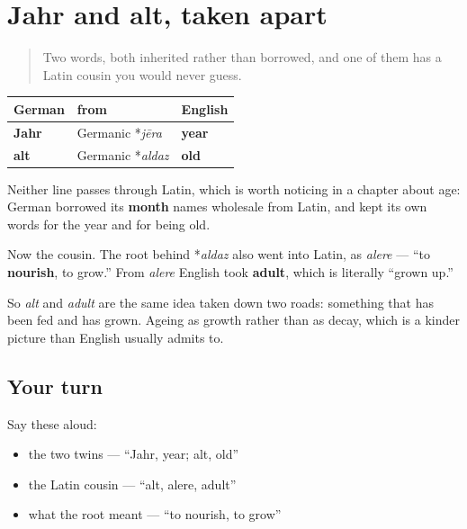 \section[Jahr und alt]{Jahr and alt, taken apart}

\label{lesson:GE-C14-jahr-alt}



\begin{quote}
Two words, both inherited rather than borrowed, and one of them has a Latin cousin you would never guess.
\end{quote}

\begin{cousinweb}
\noindent
\begin{tabularx}{\linewidth}{@{}>{\raggedright\arraybackslash}X>{\raggedright\arraybackslash}X>{\raggedright\arraybackslash}X@{}}
\toprule
\textbf{German} & \textbf{from} & \textbf{English} \\
\midrule
\textbf{Jahr} & Germanic *\emph{jēra} & \textbf{year} \\
\textbf{alt} & Germanic *\emph{aldaz} & \textbf{old} \\
\bottomrule
\end{tabularx}

Neither line passes through Latin, which is worth noticing in a chapter about age: German borrowed its \textbf{month} names wholesale from Latin, and kept its own words for the year and for being old.

Now the cousin. The root behind *\emph{aldaz} also went into Latin, as \emph{alere} — \textquotedblleft{}to \textbf{nourish}, to grow.\textquotedblright{} From \emph{alere} English took \textbf{adult}, which is literally \textquotedblleft{}grown up.\textquotedblright{}

So \emph{alt} and \emph{adult} are the same idea taken down two roads: something that has been fed and has grown. Ageing as growth rather than as decay, which is a kinder picture than English usually admits to.
\end{cousinweb}

\subsection*{Your turn}
Say these aloud:

\begin{itemize}
\raggedright
  \item the two twins — \textquotedblleft{}Jahr, year; alt, old\textquotedblright{}
  \item the Latin cousin — \textquotedblleft{}alt, alere, adult\textquotedblright{}
  \item what the root meant — \textquotedblleft{}to nourish, to grow\textquotedblright{}
\end{itemize}

